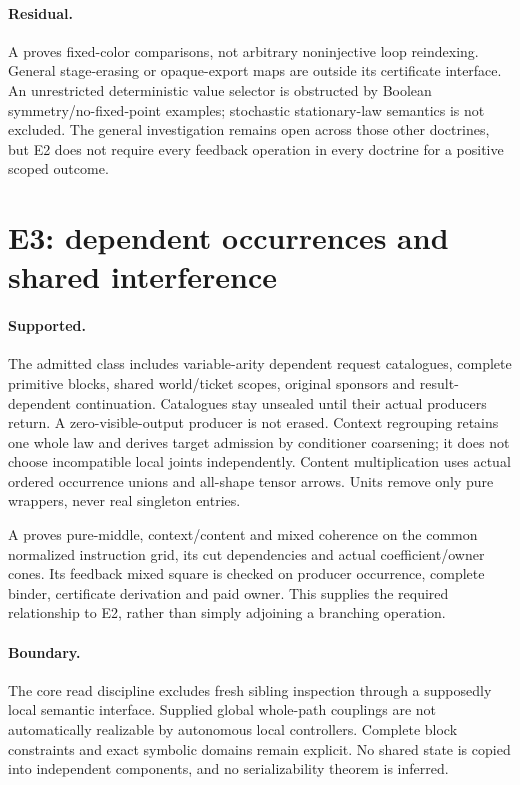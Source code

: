\documentclass[11pt]{article}
\begin{document}
\paragraph{Residual.} A proves fixed-color comparisons, not arbitrary noninjective loop reindexing. General stage-erasing or opaque-export maps are outside its certificate interface. An unrestricted deterministic value selector is obstructed by Boolean symmetry/no-fixed-point examples; stochastic stationary-law semantics is not excluded. The general investigation remains open across those other doctrines, but E2 does not require every feedback operation in every doctrine for a positive scoped outcome.

\section{E3: dependent occurrences and shared interference}
\paragraph{Supported.} The admitted class includes variable-arity dependent request catalogues, complete primitive blocks, shared world/ticket scopes, original sponsors and result-dependent continuation. Catalogues stay unsealed until their actual producers return. A zero-visible-output producer is not erased. Context regrouping retains one whole law and derives target admission by conditioner coarsening; it does not choose incompatible local joints independently. Content multiplication uses actual ordered occurrence unions and all-shape tensor arrows. Units remove only pure wrappers, never real singleton entries.

A proves pure-middle, context/content and mixed coherence on the common normalized instruction grid, its cut dependencies and actual coefficient/owner cones. Its feedback mixed square is checked on producer occurrence, complete binder, certificate derivation and paid owner. This supplies the required relationship to E2, rather than simply adjoining a branching operation.

\paragraph{Boundary.} The core read discipline excludes fresh sibling inspection through a supposedly local semantic interface. Supplied global whole-path couplings are not automatically realizable by autonomous local controllers. Complete block constraints and exact symbolic domains remain explicit. No shared state is copied into independent components, and no serializability theorem is inferred.
\end{document}
